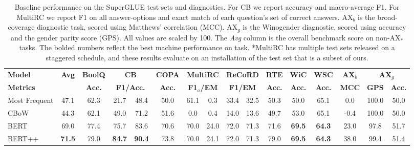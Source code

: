 \begin{table*}[t]
\footnotesize

\caption{Baseline performance on the SuperGLUE test sets and diagnostics. 
For CB we report accuracy and macro-average F1. For MultiRC we report F1 on all answer-options and exact match of each question's set of correct answers. AX$_b$ is the broad-coverage diagnostic task, scored using Matthews' correlation (MCC). AX$_g$ is the Winogender diagnostic, scored using accuracy and the gender parity score (GPS). All values are scaled by 100. The \textit{Avg} column is the overall benchmark score on non-AX$_*$ tasks.
The bolded numbers reflect the best machine performance on task.
*MultiRC has multiple test sets released on a staggered schedule, 
and these results evaluate on an installation of the test set that is a subset of ours.
}

\centering %
\fontsize{8.4}{10.1}\selectfont
\setlength{\tabcolsep}{0.3em}

\begin{tabular}{lccc@{/}ccc@{/}cc@{/}cccccc@{/}c}

\toprule

\textbf{Model} & \multicolumn{1}{c}{\textbf{Avg}} & \multicolumn{1}{c}{\textbf{BoolQ}} & \multicolumn{2}{c}{\textbf{CB}} &  \multicolumn{1}{c}{\textbf{COPA}} & \multicolumn{2}{c}{\textbf{MultiRC}} & \multicolumn{2}{c}{\textbf{ReCoRD}} & \multicolumn{1}{c}{\textbf{RTE}} & \multicolumn{1}{c}{\textbf{WiC}} & \multicolumn{1}{c}{\textbf{WSC}} & 
\multicolumn{1}{c}{\textbf{AX$_b$}} &
\multicolumn{2}{c}{\textbf{AX$_g$}} \\
\textbf{Metrics} & \multicolumn{1}{c}{} & \multicolumn{1}{c}{\textbf{Acc.}} & \multicolumn{2}{c}{\textbf{F1/Acc.}} &  \multicolumn{1}{c}{\textbf{Acc.}} & \multicolumn{2}{c}{\textbf{F1$_a$/EM}} & \multicolumn{2}{c}{\textbf{F1/EM}} & \multicolumn{1}{c}{\textbf{Acc.}} & \multicolumn{1}{c}{\textbf{Acc.}} & \multicolumn{1}{c}{\textbf{Acc.}} &
\multicolumn{1}{c}{\textbf{MCC}} & 
\multicolumn{1}{c}{\textbf{GPS}} & 
\multicolumn{1}{c}{\textbf{Acc.}} \\
\midrule

Most Frequent & 47.1 & 62.3 & 21.7 & 48.4 & 50.0 & 61.1 & 0.3 & 33.4 & 32.5 & 50.3 & 50.0 & 65.1 & 0.0 & 100.0 & 50.0 \\
CBoW & 44.3 & 62.1 & 49.0  & 71.2 &  51.6 & 0.0 & 0.4 & 14.0 & 13.6 & 49.7 & 53.0 & 65.1 & -0.4 & 100.0 & 50.0 \\
BERT & 69.0 & 77.4 & 75.7 & 83.6 & 70.6 & 70.0 & 24.0 & 72.0 & 71.3 & 71.6 & \textbf{69.5} & \textbf{64.3} & 23.0 & 97.8 & 51.7 \\
BERT++ & \textbf{71.5} & 79.0 & \textbf{84.7} & \textbf{90.4} & 73.8 & 70.0 & 24.1 & 72.0 & 71.3 & 79.0 & \textbf{69.5} & \textbf{64.3} & 38.0 & 99.4 & 51.4 \\


\end{tabular}
\end{table*}
